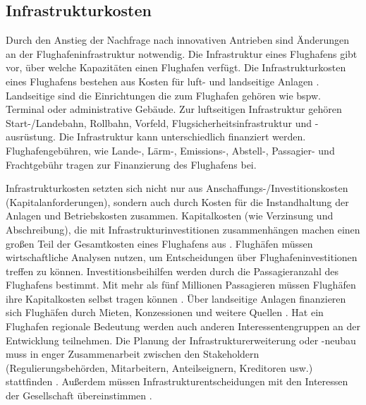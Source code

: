 \subsection{Infrastrukturkosten}
%
Durch den Anstieg der Nachfrage nach innovativen Antrieben sind Änderungen an der Flughafeninfrastruktur notwendig.
%
Die Infrastruktur eines Flughafens gibt vor, über welche Kapazitäten einen Flughafen verfügt.
Die Infrastrukturkosten eines Flughafens bestehen aus Kosten für luft- und landseitige Anlagen \cite{fur2003infrastrukturkosten}. 
Landseitige sind die Einrichtungen die zum Flughafen gehören wie bspw. Terminal oder administrative Gebäude. 
Zur luftseitigen Infrastruktur gehören Start-/Landebahn, Rollbahn, Vorfeld, Flugsicherheitsinfrastruktur und -ausrüstung. 
Die Infrastruktur kann unterschiedlich finanziert werden.
Flughafengebühren, wie Lande-, Lärm-, Emissions-, Abstell-, Passagier- und Frachtgebühr 
tragen zur Finanzierung des Flughafens bei.

Infrastrukturkosten setzten sich nicht nur aus Anschaffungs-/Investitionskosten (Kapitalanforderungen), 
sondern auch durch Kosten für die Instandhaltung der Anlagen und Betriebskosten zusammen.
Kapitalkosten (wie Verzinsung und Abschreibung), die mit Infrastrukturinvestitionen zusammenhängen 
machen einen großen Teil der Gesamtkosten eines Flughafens aus \cite{wittmer2011aviation}.
%
Flughäfen müssen wirtschaftliche Analysen nutzen, um Entscheidungen über Flughafeninvestitionen treffen zu können. %
Investitionsbeihilfen werden durch die Passagieranzahl des Flughafens bestimmt. 
Mit mehr als fünf Millionen Passagieren müssen Flughäfen ihre Kapitalkosten selbst tragen können \cite{conrady2019luftverkehr}. 
%
Über landseitige Anlagen finanzieren sich Flughäfen durch Mieten, Konzessionen und weitere Quellen \cite{fur2003infrastrukturkosten}.
Hat ein Flughafen regionale Bedeutung werden auch anderen Interessentengruppen an der Entwicklung teilnehmen.
Die Planung der Infrastrukturerweiterung oder -neubau muss in enger Zusammenarbeit 
zwischen den Stakeholdern (Regulierungsbehörden, Mitarbeitern, Anteilseignern, Kreditoren usw.) stattfinden \cite{wittmer2011aviation}.
%
Außerdem müssen Infrastrukturentscheidungen mit den Interessen der Gesellschaft übereinstimmen \cite{WissenschaftlicherBeirat2011}. 


